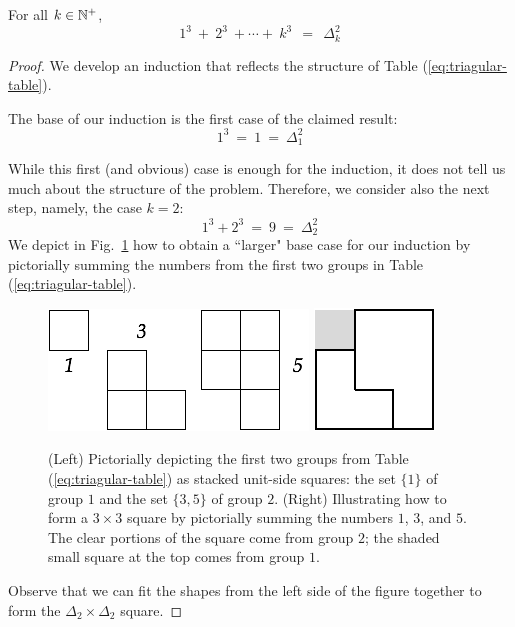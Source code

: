 \begin{prop}
\label{thm:cubes-sumto-Delta-saquared}
For all $k \in \mathbb{N}^+$,
\[ 1^3 \ + \ 2^3 \ + \cdots + \ k^3 \ \ = \ \ \Delta_k^2 \]
\end{prop}

\begin{proof}
We develop an induction that reflects the structure of Table (\ref{eq:triagular-table}).

\smallskip

The base of our induction is the first case of the claimed result:
\[  1^3 \  = \ 1 \ = \ \Delta_1^2 \]

While this first (and obvious) case is enough for the induction, it does not tell us much about the structure of the problem.  Therefore, we consider also the next step, namely, the case $k=2$:
\[  1^3 + 2^3 \ = \ 9 \ = \ \Delta_2^2 \]
We depict in Fig.~\ref{fig:sumCubes1} how to obtain a ``larger" base case for our induction by pictorially summing the numbers from the first two groups in Table (\ref{eq:triagular-table}).
\begin{figure}[hbt]
\begin{center}
       \includegraphics[scale=0.35]{FiguresMaths/SumCubes1} \hspace{2cm}
       \includegraphics[scale=0.35]{FiguresMaths/SumCubes1bis}
\caption{(Left) Pictorially depicting the first two groups from Table (\ref{eq:triagular-table}) as stacked unit-side squares: the set $\{1\}$ of group $1$ and the set $\{3, 5\}$ of group $2$. (Right) Illustrating how to form a $3 \times 3$ square by pictorially summing the numbers $1$, $3$, and $5$.  The clear portions of the square come from  group $2$; the shaded small square at the top comes from group $1$.}
       \label{fig:sumCubes1}
\end{center}
\end{figure}
Observe that we can fit the shapes from the left side of the figure together to form the $\Delta_2 \times \Delta_2$ square.


\end{proof}
